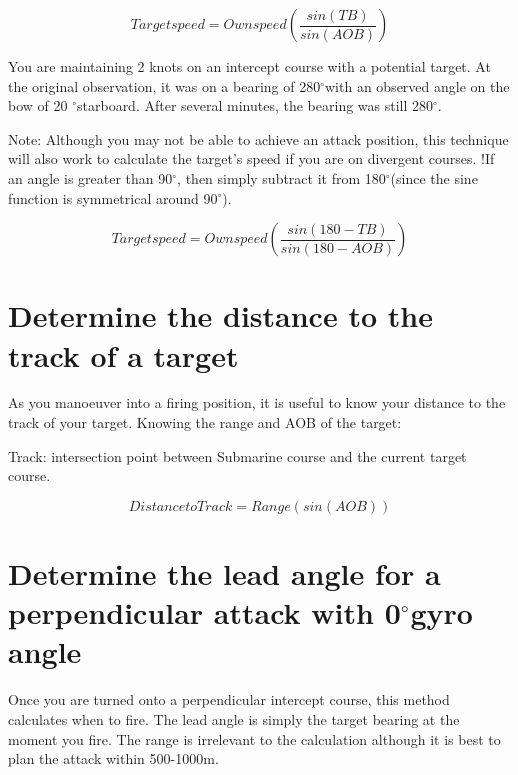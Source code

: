 \documentclass{article}
\newcommand{\degree}{$^{\circ}$}
\begin{document}
$$Target speed = Own speed \left( \frac{sin(TB)}{sin (AOB)} \right)$$

You are maintaining 2 knots on an intercept course with a potential target. At the original observation, it was on a bearing of 280\degree with an observed angle on the bow of 20 \degree starboard. After several minutes, the bearing was still 280\degree.

Note: Although you may not be able to achieve an attack position, this technique will also work to calculate the target’s speed if you are on divergent courses. !If an angle is greater than 90\degree, then simply subtract it from 180\degree (since the sine function is symmetrical around 90\degree).

$$Target speed = Own speed \left( \frac{sin(180-TB)}{sin (180-AOB)} \right)$$

\section{Determine the distance to the track of a target}

As you manoeuver into a firing position, it is useful to know your distance to the track of your target. Knowing the range and AOB of the target:

Track: intersection point between Submarine course and the current target course.

$$Distance to Track = Range \left( sin(AOB) \right)$$
%
%
%



\section{Determine the lead angle for a perpendicular attack with 0\degree gyro angle}

Once you are turned onto a perpendicular intercept course, this method calculates when to fire. The lead angle is simply the target bearing at the moment you fire. The range is irrelevant to the calculation although it is best to plan the attack within 500-1000m.
\end{document}
